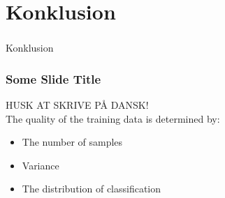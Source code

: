 \section[Konklusion]{Konklusion}

\begin{frame}
  \frametitle{}
  \begin{center}
    {\Huge Konklusion}
  \end{center}
\end{frame}

\begin{frame}
  \frametitle{Some Slide Title}
  HUSK AT SKRIVE PÅ DANSK!\\
  The quality of the training data is determined by:
  \begin{itemize}
    \item The number of samples
    \item Variance
    \item The distribution of classification
  \end{itemize}
\end{frame}
